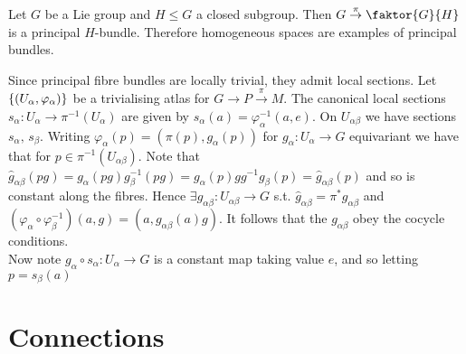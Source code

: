 \documentclass{article}
\begin{document}
\begin{example}
	Let $G$ be a Lie group and $H \leq G$ a closed subgroup. Then $G \overset{\pi}{\to}\faktor{G}{H}$ is a principal $H$-bundle. Therefore homogeneous spaces are examples of principal bundles. 
\end{example}

Since principal fibre bundles are locally trivial, they admit local sections. Let $\left\{ (U_\alpha, \varphi_\alpha) \right\}$ be a trivialising atlas for $G \to P \overset{\pi}{\to} M$. The canonical local sections $s_\alpha : U_\alpha \to \pi^{-1}(U_\alpha)$ are given by $s_\alpha(a) = \varphi_\alpha^{-1}(a,e)$. On $U_{\alpha\beta}$ we have sections $s_\alpha, \, s_\beta$. Writing $\varphi_\alpha(p) = (\pi(p),g_\alpha(p))$ for $g_\alpha: U_\alpha \to G$ equivariant we have that for $p\in \pi^{-1}(U_{\alpha\beta})$.
Note that $\hat{g}_{\alpha\beta}(pg) = g_\alpha(pg) g_\beta^{-1}(pg) = g_\alpha(p)  g g^{-1} g_\beta(p) = \hat{g}_{\alpha\beta}(p)$ and so is constant along the fibres. Hence $\exists g_{\alpha\beta}:U_{\alpha\beta} \to G $ s.t. $\hat{g}_{\alpha\beta} = \pi^\ast g_{\alpha\beta}$ and $(\varphi_\alpha \circ \varphi_\beta^{-1})(a,g) = (a,g_{\alpha\beta}(a)g)$. It follows that the $g_{\alpha\beta}$ obey the cocycle conditions. \\
Now note $g_\alpha \circ s_\alpha : U_\alpha \to G$ is a constant map taking value $e$, and so letting $p = s_\beta(a)$
\section{Connections}
\end{document}
